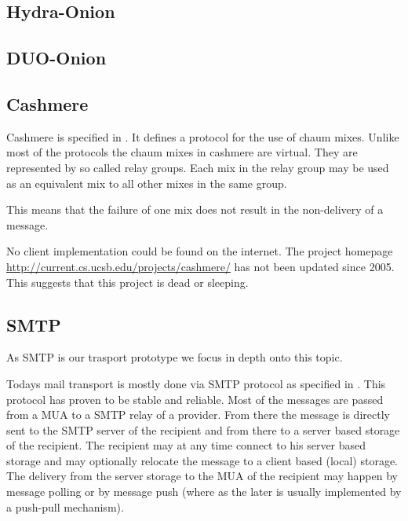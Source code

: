 \cite{mislove2004ap3}


\subsection{Hydra-Onion}
\cite{iwanik2005duo}


\subsection{DUO-Onion}
\cite{iwanik2005duo}


\subsection{Cashmere}
Cashmere is specified in \cite{zhuang2005cashmere}. It defines a protocol for the use of chaum mixes. Unlike most of the protocols the chaum mixes in cashmere are virtual. They are represented by so called relay groups. Each mix in the relay group may be used as an equivalent mix to all other mixes in the same group. 

This means that the failure of one mix does not result in the non-delivery of a message.

No client implementation could be found on the internet. The project homepage \href{http://current.cs.ucsb.edu/projects/cashmere/}{http://current.cs.ucsb.edu/projects/cashmere/} has not been updated since 2005. This suggests that this project is dead or sleeping.

\subsection{SMTP\label{sec:mailTransport}}
As SMTP is our trasport prototype we focus in depth onto this topic.

Todays mail transport is mostly done via SMTP protocol as specified in \cite{RFC5321}. This protocol has proven to be stable and reliable. Most of the messages are passed from a MUA to a SMTP relay of a provider. From there the message is directly sent to the SMTP server of the recipient and from there to a server based storage of the recipient. The recipient may at any time connect to his server based storage and may optionally relocate the message to a client based (local) storage. The delivery from the server storage to the MUA of the recipient may happen by message polling or by message push (where as the later is usually implemented by a push-pull mechanism).\par

